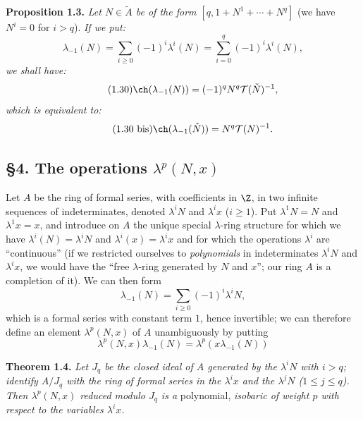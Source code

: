 \textbf{Proposition 1.3.} \emph{Let $N\in\widetilde A$ be of the form $[q,1+N^1+\cdots+N^q]$} (we have $N^i=0$ for $i>q$). \emph{If we put:}
\[
\lambda_{-1}(N)=\sum_{i\geq0}(-1)^i\lambda^i(N)=\sum_{i=0}^{q}(-1)^i\lambda^i(N),
\]
\emph{we shall have:}
\begin{equation}\tag{1.30}
\ch(\lambda_{-1}(N))=(-1)^q N^q\mathcal T(\check N)^{-1},
\end{equation}
%
\emph{which is equivalent to:}
\begin{equation}\tag{1.30 bis}
\ch(\lambda_{-1}(\check N))=N^q\mathcal T(N)^{-1}.
\end{equation}

\subsection*{\S 4. The operations $\lambda^p(N,x)$}

Let $A$ be the ring of formal series, with coefficients in $\Z$, in two infinite sequences of indeterminates, denoted $\lambda^iN$ and $\lambda^i x$ ($i\geq1$). Put $\lambda^1N=N$ and $\lambda^1x=x$, and introduce on $A$ the unique special $\lambda$-ring structure for which we have $\lambda^i(N)=\lambda^iN$ and $\lambda^i(x)=\lambda^ix$ and for which the operations $\lambda^i$ are ``continuous'' (if we restricted ourselves to \emph{polynomials} in indeterminates $\lambda^iN$ and $\lambda^ix$, we would have the ``free $\lambda$-ring generated by $N$ and $x$''; our ring $A$ is a completion of it). We can then form
\begin{equation}\tag{1.31}
\lambda_{-1}(N)=\sum_{i\geq0}(-1)^i\lambda^iN,
\end{equation}
which is a formal series with constant term $1$, hence invertible; we can therefore define an element $\lambda^p(N,x)$ of $A$ unambiguously by putting
\begin{equation}\tag{1.32}
\lambda^p(N,x)\lambda_{-1}(N)=\lambda^p(x\lambda_{-1}(N))
\end{equation}

\textbf{Theorem 1.4.} \emph{Let $J_q$ be the closed ideal of $A$ generated by the $\lambda^iN$ with $i>q$; identify $A/J_q$ with the ring of formal series in the $\lambda^i x$ and the $\lambda^jN$ ($1\leq j\leq q$). Then $\lambda^p(N,x)$ reduced modulo $J_q$ is a} polynomial, \emph{isobaric of weight $p$ with respect to the variables $\lambda^i x$.}

